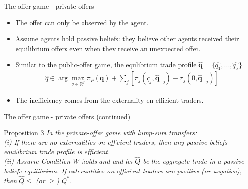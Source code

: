 \documentclass[aspectratio=169]{beamer}  %
\begin{document}
\begin{frame}{The offer game - private offers}
    \begin{itemize}
        \item The offer can only be observed by the agent. \vspace{.2cm}
        \item Assume agents hold passive beliefs: they believe other agents received their equilibrium offers even when they receive an unexpected offer. \vspace{.2cm}
        \item Similar to the public-offer game, the equlibrium trade profile $\hat{\mathbf{q}}=\{\hat{q_1},...,\hat{q_J}\}$ 
        \begin{align*}
            \hat{q} \in \arg \max_{q \in \mathbb{R}^J} \pi_P(\mathbf{q}) + \sum_j [ \pi_j(q_j, \hat{\mathbf{q}}_{-j}) - \pi_j(0, \hat{\mathbf{q}}_{-j})]
        \end{align*}
        \item The inefficiency comes from the externality on efficient traders.
    \end{itemize}
\end{frame}



\begin{frame}{The offer game - private offers (continued)}
    \begin{block}{Proposition 3}
        \textit{In the private-offer game with lump-sum transfers:\\
        (i) If there are no externalities on efficient traders, then any passive beliefs equilibrium trade profile is efficient.}\\
        \textit{(ii) Assume Condition $W$ holds and and let $\hat{Q}$ be the aggregate trade in a passive beliefs equilibrium. If externalities on efficient traders are positive (or negative), then $\hat{Q} \leq$ (or $\geq$) $Q^*$.}
    \end{block}
\end{frame}
\end{document}
